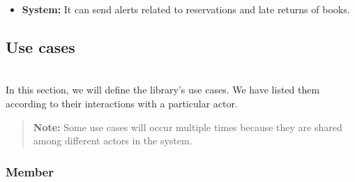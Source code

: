 \begin{itemize}
\item
\protect{}\label{jMcrrvs2GYW-aLCCapt0G}
\textbf{System:} It can send alerts related to reservations and late returns of books.
\end{itemize}

\subsection{Use cases}\label{6QmDNyPmjH9OLYt8xMCg1}
\\
In this section, we will define the library's use cases. We have listed them according to their interactions with a particular actor.
\begin{quote}
\textbf{Note:} Some use cases will occur multiple times because they are shared among different actors in the system.
\end{quote}
\subsubsection{Member}\label{poqsLui6wHPhnv2lhyyva}

